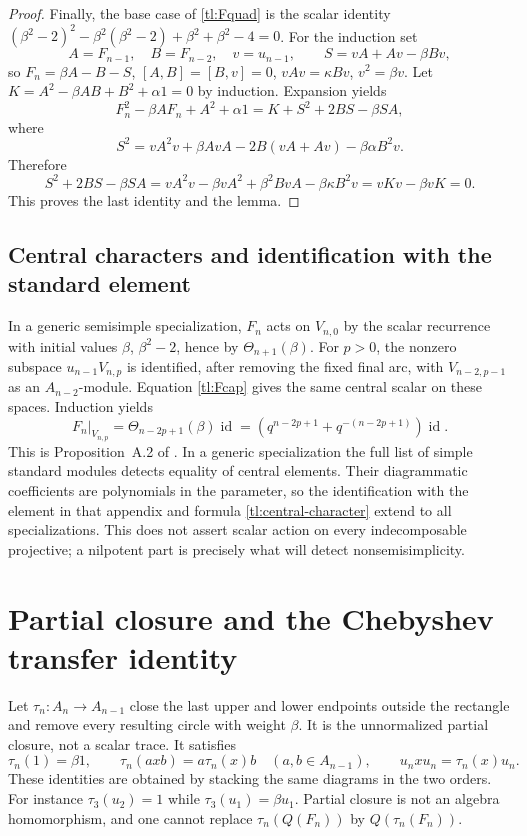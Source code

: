 \documentclass[a4paper,11pt,oneside,reqno]{amsart}
\theoremstyle{definition}
\numberwithin{equation}{section}
\begin{document}
\begin{proof}
		Finally, the base case of \eqref{tl:Fquad} is the scalar identity
		$(\beta^2-2)^2-\beta^2(\beta^2-2)+\beta^2+\beta^2-4=0$.
		For the induction set
		\[
		A=F_{n-1},\quad B=F_{n-2},\quad v=u_{n-1},\qquad
		S=vA+Av-\beta Bv,
		\]
		so $F_n=\beta A-B-S$, $[A,B]=[B,v]=0$,
		$vAv=\kappa Bv$, $v^2=\beta v$.  Let
		$K=A^2-\beta AB+B^2+\alpha1=0$ by induction.  Expansion yields
		\[
		F_n^2-\beta AF_n+A^2+\alpha1=K+S^2+2BS-\beta SA,
		\]
		where
		\[
		S^2=vA^2v+\beta AvA-2B(vA+Av)-\beta\alpha B^2v.
		\]
		Therefore
		\[
		S^2+2BS-\beta SA
		=vA^2v-\beta vA^2+\beta^2BvA-\beta\kappa B^2v
		=vKv-\beta vK=0.
		\]
		This proves the last identity and the lemma.
	\end{proof}
	
	\subsection{Central characters and identification with the standard element}
	In a generic semisimple specialization, $F_n$ acts on $V_{n,0}$
	by the scalar recurrence with initial values $\beta$, $\beta^2-2$,
	hence by $\Theta_{n+1}(\beta)$.  For $p>0$, the nonzero subspace
	$u_{n-1}V_{n,p}$ is identified, after removing the fixed final arc,
	with $V_{n-2,p-1}$ as an $A_{n-2}$-module.  Equation
	\eqref{tl:Fcap} gives the same central scalar on these spaces.
	Induction yields
	\begin{equation}\label{tl:central-character}
		F_n|_{V_{n,p}}=\Theta_{n-2p+1}(\beta)\operatorname{id}
		=(q^{n-2p+1}+q^{-(n-2p+1)})\operatorname{id}.
	\end{equation}
	This is Proposition~A.2 of \cite{RSA}.  In a generic specialization
	the full list of simple standard modules detects equality of central
	elements.  Their diagrammatic coefficients are polynomials in the
	parameter, so the identification with the element in that appendix
	and formula \eqref{tl:central-character} extend to all
	specializations.  This does not assert scalar action on every
	indecomposable projective; a nilpotent part is precisely what will
	detect nonsemisimplicity.
	
	\section{Partial closure and the Chebyshev transfer identity}\label{tl:closure}
	Let $\tau_n:A_n\to A_{n-1}$ close the last upper and lower endpoints
	outside the rectangle and remove every resulting circle with weight
	$\beta$.  It is the unnormalized partial closure, not a scalar trace.
	It satisfies
	\begin{equation}\label{tl:tau-basic}
		\tau_n(1)=\beta1,\qquad
		\tau_n(axb)=a\tau_n(x)b\quad(a,b\in A_{n-1}),\qquad
		u_nxu_n=\tau_n(x)u_n.
	\end{equation}
	These identities are obtained by stacking the same diagrams in the
	two orders.  For instance $\tau_3(u_2)=1$ while
	$\tau_3(u_1)=\beta u_1$.  Partial closure is not an algebra
	homomorphism, and one cannot replace $\tau_n(Q(F_n))$ by
	$Q(\tau_n(F_n))$.
	
\end{document}

